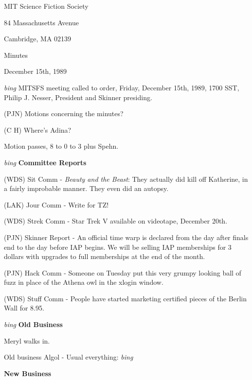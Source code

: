 \setlength{\topmargin}{-0.5in}
\setlength{\oddsidemargin}{-0.60in}
\setlength{\textheight}{9in}
\setlength{\textwidth}{6.5in}



\begin{center}
MIT Science Fiction Society

84 Massachusetts Avenue

Cambridge, MA 02139

\vspace{0.2in}
Minutes

December 15th, 1989

\end{center}
 
\vspace{0.15in}
{\em bing\/}  MITSFS meeting called to order, Friday, December 15th, 1989,
1700 SST, Philip J. Nesser, President and Skinner presiding.

(PJN) Motions concerning the minutes?

(C H) Where's Adina?

Motion passes, 8 to 0 to 3 plus Spehn.

\vspace{0.15in}
{\em bing\/}  {\bf Committee Reports}

(WDS) Sit Comm - {\em Beauty and the Beast}: They actually did kill
off Katherine, in a fairly improbable manner.  They even did an
autopsy.

(LAK) Jour Comm - Write for TZ!

(WDS) Strek Comm - Star Trek V available on videotape, December 20th.

(PJN) Skinner Report - An official time warp is declared from the day
after finals end to the day before IAP begins.  We will be selling IAP
memberships for 3 dollars with upgrades to full memberships at the end
of the month.

(PJN) Hack Comm - Someone on Tuesday put this very grumpy looking ball
of fuzz in place of the Athena owl in the xlogin window.

(WDS) Stuff Comm - People have started marketing certified pieces of
the Berlin Wall for 8.95.

\vspace{0.15in}
{\em bing\/}  {\bf Old Business}

Meryl walks in.

Old business Algol - Usual everything: {\em bing\/}

\vspace{0.15in}
{\bf New Business}


